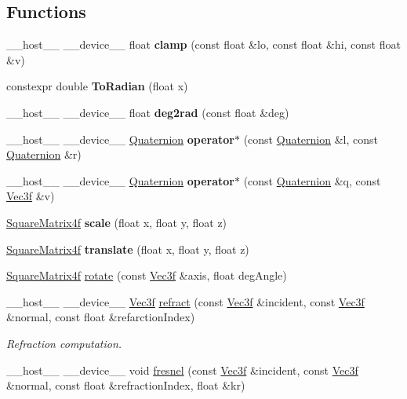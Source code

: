 \subsection*{Functions}
\begin{DoxyCompactItemize}
\item 
\+\_\+\+\_\+host\+\_\+\+\_\+ \+\_\+\+\_\+device\+\_\+\+\_\+ float {\bfseries clamp} (const float \&lo, const float \&hi, const float \&v)
\item 
constexpr double {\bfseries To\+Radian} (float x)
\item 
\+\_\+\+\_\+host\+\_\+\+\_\+ \+\_\+\+\_\+device\+\_\+\+\_\+ float {\bfseries deg2rad} (const float \&deg)
\item 
\+\_\+\+\_\+host\+\_\+\+\_\+ \+\_\+\+\_\+device\+\_\+\+\_\+ \hyperlink{class_quaternion}{Quaternion} {\bfseries operator$\ast$} (const \hyperlink{class_quaternion}{Quaternion} \&l, const \hyperlink{class_quaternion}{Quaternion} \&r)
\item 
\+\_\+\+\_\+host\+\_\+\+\_\+ \+\_\+\+\_\+device\+\_\+\+\_\+ \hyperlink{class_quaternion}{Quaternion} {\bfseries operator$\ast$} (const \hyperlink{class_quaternion}{Quaternion} \&q, const \hyperlink{class_vec3}{Vec3f} \&v)
\item 
\hyperlink{class_square_matrix4}{Square\+Matrix4f} {\bfseries scale} (float x, float y, float z)
\item 
\hyperlink{class_square_matrix4}{Square\+Matrix4f} {\bfseries translate} (float x, float y, float z)
\item 
\hyperlink{class_square_matrix4}{Square\+Matrix4f} \hyperlink{group__linear__algebra_gac7b995c759cd539cf455cae62c4184e6}{rotate} (const \hyperlink{class_vec3}{Vec3f} \&axis, float deg\+Angle)
\item 
\+\_\+\+\_\+host\+\_\+\+\_\+ \+\_\+\+\_\+device\+\_\+\+\_\+ \hyperlink{class_vec3}{Vec3f} \hyperlink{group__linear__algebra_ga9f88dab197e2bd7e0940faf4fd447465}{refract} (const \hyperlink{class_vec3}{Vec3f} \&incident, const \hyperlink{class_vec3}{Vec3f} \&normal, const float \&refarction\+Index)
\begin{DoxyCompactList}\small\item\em Refraction computation. \end{DoxyCompactList}\item 
\+\_\+\+\_\+host\+\_\+\+\_\+ \+\_\+\+\_\+device\+\_\+\+\_\+ void \hyperlink{group__linear__algebra_ga02c442d21d81c8d0cf889f830eddc236}{fresnel} (const \hyperlink{class_vec3}{Vec3f} \&incident, const \hyperlink{class_vec3}{Vec3f} \&normal, const float \&refraction\+Index, float \&kr)

\end{DoxyCompactItemize}
